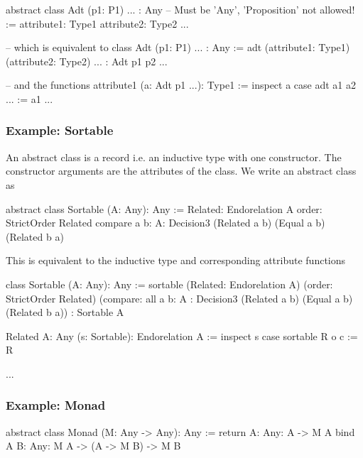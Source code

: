 \begin{alba}
    abstract class
        Adt (p1: P1) ... : Any   -- Must be 'Any', 'Proposition' not allowed!
    :=
        attribute1: Type1
        attribute2: Type2
        ...

    -- which is equivalent to
    class
        Adt (p1: P1) ... : Any
    :=
        adt (attribute1: Type1) (attribute2: Type2) ... : Adt p1 p2 ...

    -- and the functions
    attribute1 (a: Adt p1 ...): Type1 :=
        inspect a case
            adt a1 a2 ... := a1
    ...
\end{alba}






\subsubsection{Example: Sortable}

An abstract class is a record i.e. an inductive type with one constructor. The
constructor arguments are the attributes of the class. We write an abstract
class as

\begin{alba}
    abstract class
        Sortable (A: Any): Any
    :=
        Related: Endorelation A
        order: StrictOrder Related
        compare {a b: A}: Decision3 (Related a b) (Equal a b) (Related b a)
\end{alba}

This is equivalent to the inductive type and corresponding attribute functions

\begin{alba}
    class
        Sortable (A: Any): Any
    :=
        sortable
            (Related: Endorelation A)
            (order: StrictOrder Related)
            (compare:
                all {a b: A}
                : Decision3 (Related a b) (Equal a b) (Related b a))
            : Sortable A

    Related {A: Any} (s: Sortable): Endorelation A :=
        inspect s case
            sortable R o c := R

    ...
\end{alba}




\subsubsection{Example: Monad}

\begin{alba}
    abstract class
        Monad (M: Any -> Any): Any
    :=
        return {A: Any}: A -> M A
        bind
            {A B: Any}: M A -> (A -> M B) -> M B
\end{alba}


